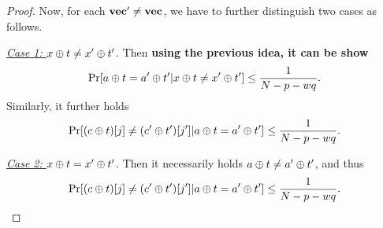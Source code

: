 \begin{proof}
Now, for each $\mathbf{vec}'\neq\mathbf{vec}$, we have to further distinguish two cases as follows.


\arrangespace

\noindent \textit{\underline{Case 1: $x\oplus t\neq x'\oplus t'$}}. Then {\bf using the previous idea, it can be show}
%
$$\Pr[a\oplus t=a'\oplus t'|x\oplus t\neq x'\oplus t']\leq\frac{1}{N-p-wq}.$$
%
Similarly, it further holds
%
$$\Pr[(c\oplus t)[j]\neq(c'\oplus t')[j']|a\oplus t=a'\oplus t']\leq\frac{1}{N-p-wq}.$$
%


\arrangespace

\noindent \textit{\underline{Case 2: $x\oplus t=x'\oplus t'$}}. Then it necessarily holds $a\oplus t\neq a'\oplus t'$, and thus
%
$$\Pr[(c\oplus t)[j]\neq(c'\oplus t')[j']|a\oplus t=a'\oplus t']\leq\frac{1}{N-p-wq}.$$
%


\arrangespace





\end{proof}
